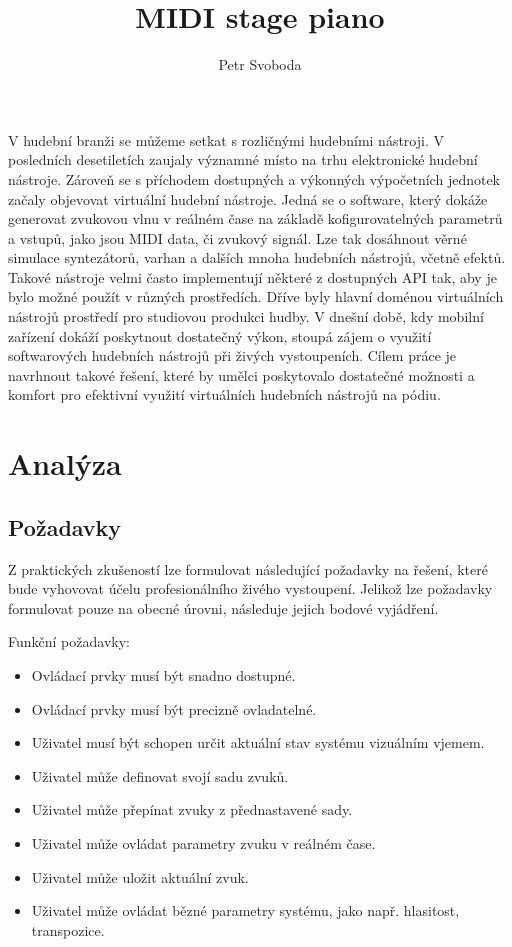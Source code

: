 \documentclass[thesis=M,czech]{FITthesis}[2019/03/06]
\title{MIDI stage piano}
\author{Petr Svoboda} %
\begin{document}
	
	
	\begin{introduction}
		V hudební branži se můžeme setkat s rozličnými hudebními nástroji. V posledních desetiletích
		zaujaly významné místo na trhu elektronické hudební nástroje. Zároveň se s příchodem dostupných a výkonných
		výpočetních jednotek začaly objevovat virtuální hudební nástroje\cite{kogan2008brief}.
		Jedná se o software, který dokáže generovat zvukovou vlnu v reálném čase na základě kofigurovatelných parametrů a vstupů, jako jsou MIDI data, či zvukový signál.
		Lze tak dosáhnout věrné simulace syntezátorů, varhan a dalších mnoha hudebních nástrojů, včetně efektů.
		Takové nástroje velmi často implementují některé z dostupných API tak, aby je bylo možné použít v různých prostředích.
		Dříve byly hlavní doménou virtuálních nástrojů prostředí pro studiovou produkci hudby\cite{leider2004digital}.
		V dnešní době, kdy mobilní zařízení dokáží poskytnout dostatečný výkon, stoupá zájem o využití softwarových hudebních nástrojů
		při živých vystoupeních. Cílem práce je navrhnout takové řešení, které by umělci poskytovalo dostatečné možnosti a komfort 
		pro efektivní využití virtuálních hudebních nástrojů na pódiu.
	\end{introduction}
	
	\chapter{Analýza}
	\section{Požadavky}
	Z praktických zkušeností lze formulovat následující požadavky na řešení, které bude vyhovovat účelu profesionálního živého vystoupení.
	Jelikož lze požadavky formulovat pouze na obecné úrovni, následuje jejich bodové vyjádření.
	
	Funkční požadavky:
	\begin{itemize}
		\item Ovládací prvky musí být snadno dostupné.
		\item Ovládací prvky musí být precizně ovladatelné.
		\item Uživatel musí být schopen určit aktuální stav systému vizuálním vjemem.
		\item Uživatel může definovat svojí sadu zvuků.
		\item Uživatel může přepínat zvuky z přednastavené sady.
		\item Uživatel může ovládat parametry zvuku v reálném čase.
		\item Uživatel může uložit aktuální zvuk.
		\item Uživatel může ovládat bězné parametry systému, jako např. hlasitost, transpozice.
	\end{itemize}
	
\end{document}
